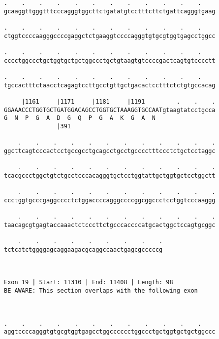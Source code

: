 \documentclass{article}
\begin{document}
\begin{Verbatim}
.    .    .    .    .    .    .    .    .    .    .    .    
gcaaggttgggtttcccagggtggcttctgatatgtcctttcttctgattcagggtgaag
                                                            
.    .    .    .    .    .    .    .    .    .    .    .    
ctggtccccaagggccccgaggctctgaaggtccccagggtgtgcgtggtgagcctggcc
                                                            
.    .    .    .    .    .    .    .    .    .    .    .    
cccctggccctgctggtgctgctggccctgctgtaagtgtccccgactcagtgtcccctt
                                                            
.    .    .    .    .    .    .    .    .    .    .    .    
tgccactttctaacctcagagtccttgcctgttgctgacactcctttctctgtgccacag
                                                            
     |1161     |1171     |1181     |1191         .    .    .
GGAAACCCTGGTGCTGATGGACAGCCTGGTGCTAAAGGTGCCAATgtaagtatcctgcca
G  N  P  G  A  D  G  Q  P  G  A  K  G  A  N                 
               |391                                         
  
    .    .    .    .    .    .    .    .    .    .    .    .
ggcttcagtcccactcctgccgcctgcagcctgcctgcccctttccctctgctcctaggc
                                                            
    .    .    .    .    .    .    .    .    .    .    .    .
tcacgccctggctgtctgcctcccacagggtgctcctggtattgctggtgctcctggctt
                                                            
    .    .    .    .    .    .    .    .    .    .    .    .
ccctggtgcccgaggcccctctggaccccagggccccggcggccctcctggtcccaaggg
                                                            
    .    .    .    .    .    .    .    .    .    .    .    .
taacagcgtgagtaccaaactctcccttctgcccaccccatgcactggctccagtgcggc
                                                            
    .    .    .    .    .    .    .    .    .
tctcatctggggagcaggaagacgcaggccaactgagcgcccccg
                                             
                                             
 
Exon 19 | Start: 11310 | End: 11408 | Length: 98
BE AWARE: This section overlaps with the following exon



.    .    .    .    .    .    .    .    .    .    .    .    
aggtccccagggtgtgcgtggtgagcctggcccccctggccctgctggtgctgctggccc
                                                            

\end{Verbatim}
\end{document}
